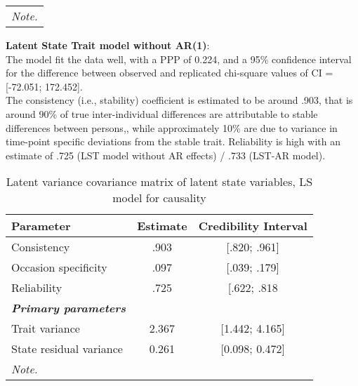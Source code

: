 \begin{table}[H]
\begin{center}
{\begin{tabular}{lcc}
 \hline 
\multicolumn{3}{p{0.4\textwidth}}{\scriptsize{\textit{Note.}}} \\
            \end{tabular}}
        \end{center}
        \end{table}


  \textbf{Latent State Trait model without AR(1)}: \\
  The model fit the data well, with a PPP of 0.224, and a 95\% confidence interval for the difference between observed and replicated chi-square values of CI = [-72.051; 172.452]. \\
The consistency (i.e., stability) coefficient is estimated to be around .903, that is around 90\% of true inter-individual differences are attributable to stable differences between persons,, while approximately 10\% are due to variance in time-point specific deviations from the stable trait. Reliability is high with an estimate of .725 (LST model without AR effects) / .733 (LST-AR model).

\begin{table}[H]
 \setlength{\tabcolsep}{1mm}
 \begin{center}
        \caption[Correlation latent State causality]{Latent variance covariance matrix of latent state variables, LS model for causality}
        \label{Tab: correlations LS causality}
            {\footnotesize
            \begin{tabular}{lcc}
            \hline 
          Parameter & Estimate & Credibility Interval\\
         \hline 
           Consistency & .903 &[.820; .961] \\
           Occasion specificity & .097&[.039; .179] \\
           Reliability &.725& [.622; .818 \\
            \textbf{\textit{Primary parameters}} & & \\
            Trait variance &2.367 & [1.442; 4.165] \\
             State residual variance  & 0.261& [0.098; 0.472] \\
 \hline 
\multicolumn{3}{p{0.4\textwidth}}{\scriptsize{\textit{Note.}}} \\
            \end{tabular}}
        \end{center}
        \end{table}






